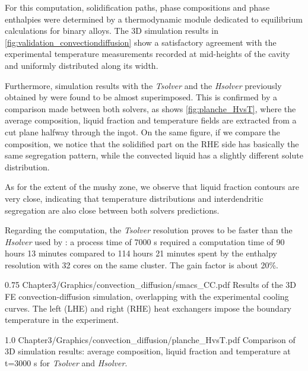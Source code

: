 For this computation, solidification paths, phase compositions and phase enthalpies were determined by a thermodynamic 
module dedicated to equilibrium calculations for binary alloys. 
The 3D simulation results in \cref{fig:validation_convectiondiffusion}
show a satisfactory agreement with the experimental temperature measurements recorded at mid-heights of the cavity and uniformly 
distributed along its width. 

Furthermore, simulation results with the \emph{Tsolver} and the \emph{Hsolver} 
previously obtained by \citet{carozzani_direct_2013} were 
found to be almost superimposed. This is confirmed by a comparison made 
between both solvers, as shows \cref{fig:planche_HvsT}, where the average composition, 
liquid fraction and temperature fields are extracted from a cut plane halfway through the ingot. 
On the same figure, if we compare the composition, we notice that the solidified part on the RHE 
side has basically the same segregation pattern, while the convected liquid has a slightly different 
solute distribution. 

As for the extent of the mushy zone, we observe that liquid
fraction contours are very close, indicating that temperature distributions and interdendritic segregation are also close between 
both solvers predictions. 

Regarding the computation, the \emph{Tsolver} resolution proves to be 
faster than the \emph{Hsolver} used by \citet{carozzani_direct_2013}: a process time of 7000 s required a computation time of 90 hours 
13 minutes compared to 114 hours 21 minutes spent by the enthalpy resolution with 32 cores on the same cluster. The gain factor 
is about 20\%.

\begin{figureth}
{0.75}
{Chapter3/Graphics/convection_diffusion/smacs_CC.pdf}
{Results of the 3D FE convection-diffusion simulation, overlapping with the experimental cooling curves.
The left (LHE) and right (RHE) heat exchangers impose the boundary temperature in the experiment.}
\label{fig:validation_convectiondiffusion}
\end{figureth}

\begin{figureth}
{1.0}
{Chapter3/Graphics/convection_diffusion/planche_HvsT.pdf}
{Comparison of 3D simulation results: average composition, liquid fraction and temperature at t=3000 s for \emph{Tsolver} and \emph{Hsolver}.}
\label{fig:planche_HvsT}
\end{figureth}


